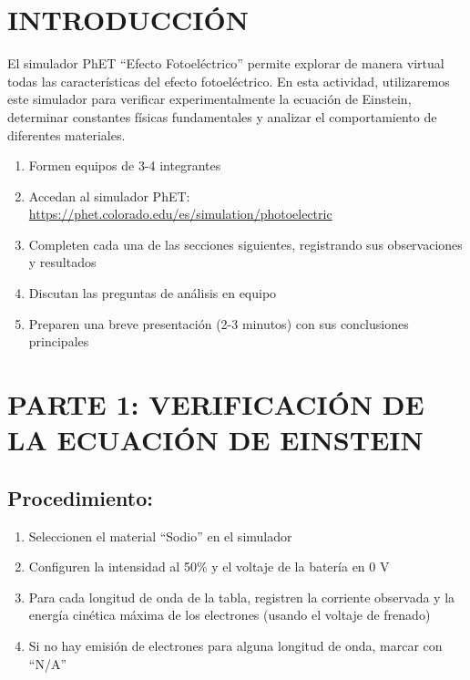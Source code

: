 \documentclass[12pt,a4paper]{article}
\begin{document}
	\section*{INTRODUCCIÓN}
	
	El simulador PhET ``Efecto Fotoeléctrico'' permite explorar de manera virtual todas las características del efecto fotoeléctrico. En esta actividad, utilizaremos este simulador para verificar experimentalmente la ecuación de Einstein, determinar constantes físicas fundamentales y analizar el comportamiento de diferentes materiales.
	
	\begin{instruccionbox}
		\begin{enumerate}
			\item Formen equipos de 3-4 integrantes
			\item Accedan al simulador PhET: \url{https://phet.colorado.edu/es/simulation/photoelectric}
			\item Completen cada una de las secciones siguientes, registrando sus observaciones y resultados
			\item Discutan las preguntas de análisis en equipo
			\item Preparen una breve presentación (2-3 minutos) con sus conclusiones principales
		\end{enumerate}
	\end{instruccionbox}
	
	\newpage
	
	\section{PARTE 1: VERIFICACIÓN DE LA ECUACIÓN DE EINSTEIN}
	
	\subsection{Procedimiento:}
	\begin{enumerate}
		\item Seleccionen el material ``Sodio'' en el simulador
		\item Configuren la intensidad al 50\% y el voltaje de la batería en 0 V
		\item Para cada longitud de onda de la tabla, registren la corriente observada y la energía cinética máxima de los electrones (usando el voltaje de frenado)
		\item Si no hay emisión de electrones para alguna longitud de onda, marcar con ``N/A''
	\end{enumerate}
	
\end{document}
